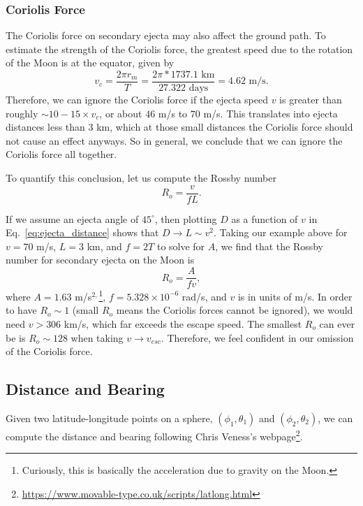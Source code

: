 \documentclass{hitec}
\numberwithin{equation}{section}
\begin{document}
\subsubsection{Coriolis Force}
The Coriolis force on secondary ejecta may also affect the ground path. To estimate the strength of the Coriolis force, the greatest speed due to the rotation of the Moon is at the equator, given by
\begin{equation}
v_c = \frac{2\pi r_m}{T} = \frac{2\pi * 1737.1 \text{ km}}{27.322 \text{ days}} = 4.62 \text{ m/s}.
\end{equation}
Therefore, we can ignore the Coriolis force if the ejecta speed $v$ is greater than roughly  $\sim10-15\times v_c$, or about $46$ m/s to $70$ m/s. This translates into ejecta distances less than $3$ km, which at those small distances the Coriolis force should not cause an effect anyways. So in general, we conclude that we can ignore the Coriolis force all together.

To quantify this conclusion, let us compute the Rossby number
\begin{equation}
R_o = \frac{v}{fL}.
\end{equation}

If we assume an ejecta angle of $45^\circ$, then plotting $D$ as a function of $v$ in Eq.\ \ref{eq:ejecta_distance} shows that $D \rightarrow L\sim v^2$. Taking our example above for $v=70$ m/s, $L = 3$ km, and $f = 2T$ to solve for $A$, we find that the Rossby number for secondary ejecta on the Moon is
\begin{equation}
R_o = \frac{A}{fv},
\end{equation}
where $A = 1.63$ m/s$^{2,}$\footnote{Curiously, this is basically the acceleration due to gravity on the Moon.}, $f = 5.328\times 10^{-6}$ rad/s, and $v$ is in units of m/s. In order to have $R_o\sim 1$ (small $R_o$ means the Coriolis forces cannot be ignored), we would need $v > 306$ km/s, which far exceeds the escape speed. The smallest $R_o$ can ever be is $R_o \sim 128$ when taking $v\to v_{esc}$. Therefore, we feel confident in our omission of the Coriolis force.

\subsection{Distance and Bearing}\label{ssec:Distance_and_Bearing}

Given two latitude-longitude points on a sphere, $(\phi_1, \theta_1)$ and $(\phi_2, \theta_2)$, we can compute the distance and bearing following Chris Veness's webpage\footnote{\url{https://www.movable-type.co.uk/scripts/latlong.html}}.
\end{document}
